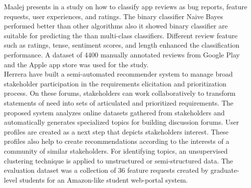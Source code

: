 Maalej presents in \cite{Maalej} a study on how to classify app reviews as bug
reports, feature requests, user experiences, and ratings. The binary classifier
Naive Bayes performed better than other algorithms also it showed binary
classifier are suitable for predicting the than multi-class
classifiers. Different review feature such as ratings,
tense, sentiment scores, and length enhanced the classification performance. A
dataset of 4400 manually annotated reviews from Google Play and the Apple app
store was used for the study.\\

Herrera \etal \cite{Castro-Herrera:2009} have built a semi-automated recommender system to manage broad stakeholder participation in
the requirements elicitation and prioritization process. On these forums,
stakeholders can work collaboratively to transform statements of need into sets
of articulated and prioritized requirements. The proposed system analyzes online
datasets gathered from stakeholders and automatically
generates specialized topics for building discussion forums. User profiles are
created as a next step that depicts stakeholders interest. These profiles also help to create recommendations according to the
interests of a community of similar stakeholders. For identifying topics, an unsupervised clustering technique is
applied to unstructured or semi-structured data.
The evaluation  dataset was a collection of 36 feature requests created by
graduate-level students for an Amazon-like student web-portal system.\\




